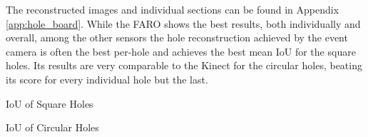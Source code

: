 The reconstructed images and individual sections can be found in Appendix \ref{app:hole_board}.
\newline \newline
While the FARO shows the best results, both individually and overall, among the other sensors the hole reconstruction achieved by the event camera is often the best per-hole and achieves the best mean IoU for the square holes. Its results are very comparable to the Kinect for the circular holes, beating its score for every individual hole but the last.

\begin{table}
\centering

\caption{IoU of Square Holes}
\label{table:square_holes}
\end{table}

\begin{table}
\centering

\caption{IoU of Circular Holes}
\label{table:circle_holes}
\end{table}